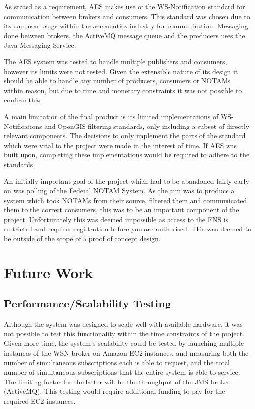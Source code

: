 \documentclass[a4paper, 12pt, twoside]{article}
\begin{document}
As stated as a requirement, AES makes use of the WS-Notification standard for communication between brokers and consumers. This standard was chosen due to its common usage within the aeronautics industry for communication. Messaging done between brokers, the ActiveMQ message queue and the producers uses the Java Messaging Service.

The AES system was tested to handle multiple publishers and consumers, however its limits were not tested. Given the extensible nature of its design it should be able to handle any number of producers, consumers or NOTAMs within reason, but due to time and monetary constraints it was not possible to confirm this.

A main limitation of the final product is its limited implementations of WS-Notifications and OpenGIS filtering standards, only including a subset of directly relevant components. The decisions to only implement the parts of the standard which were vital to the project were made in the interest of time. If AES was built upon, completing these implementations would be required to adhere to the standards.

An initially important goal of the project which had to be abandoned fairly early on was polling of the Federal NOTAM System. As the aim was to produce a system which took NOTAMs from their source, filtered them and communicated them to the correct consumers, this was to be an important component of the project. Unfortunately this was deemed impossible as access to the FNS is restricted and requires registration before you are authorised. This was deemed to be outside of the scope of a proof of concept design.

\newpage

\section{Future Work}
\label{sec:future_work}

\subsection{Performance/Scalability Testing}
\label{sec:future_testing}

Although the system was designed to scale well with available hardware, it was not possible to test this functionality within the time constraints of the project. Given more time, the system's scalability could be tested by launching multiple instances of the WSN broker on Amazon EC2 instances, and measuring both the number of simultaneous subscriptions each is able to request, and the total number of simultaneous subscriptions that the entire system is able to service. The limiting factor for the latter will be the throughput of the JMS broker (ActiveMQ). This testing would require additional funding to pay for the required EC2 instances.
\end{document}
